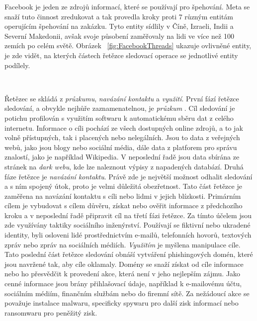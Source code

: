 Facebook je jeden ze zdrojů informací, které se používají pro špehování.
Meta se snaží tuto činnost zredukovat a tak provedla kroky proti 7 různým entitám operujícím špehování na zakázku.
Tyto entity sídlily v Číně, Izraeli, Indii a Severní Makedonii, avšak svoje působení zaměřovaly na lidi ve více než 100 zemích po celém světě.
Obrázek ~\ref{fig:FacebookThreads} ukazuje ovlivněné entity, je zde vidět, na kterých částech řetězce sledovací operace se jednotlivé entity podílely.

~

Řetězec se skládá z \textit{průzkumu}, \textit{navázání kontaktu} a \textit{využití}.
První fází řetězce sledování, a obvykle nejhůře zaznamenatelnou, je \textit{průzkum} .
Cíl sledování je potichu profilován s využitím softwaru k automatickému sběru dat z celého internetu.
Informace o cíli pochází ze všech dostupných online zdrojů, a to jak volně přístupných, tak i placených nebo nelegálních.
Jsou to data z veřejných webů, jako jsou blogy nebo sociální média, dále data z platforem pro správu znalostí, jako je například Wikipedia.
V neposlední řadě jsou data sbírána ze stránek na \textit{dark webu}, kde lze naleznout výpisy z napadených databází.
Druhá fáze řetězce je \textit{navázání kontaktu}.
Právě zde je největší možnost odhalit sledování a s ním spojený útok, proto je velmi důležitá obezřetnost.
Tato část řetězce je zaměřena na navázání kontaktu s cíli nebo lidmi v jejich blízkosti.
Primárním cílem je vybudovat s cílem důvěru, získat nebo ověřit informace z předchozího kroku a v neposlední řadě připravit cíl na třetí fázi řetězce.
Za tímto účelem jsou zde využívány taktiky sociálního inženýrství.
Používají se fiktivní nebo ukradené identity, byli osloveni lidé prostřednictvím e-mailů, telefonních hovorů, textových zpráv nebo zpráv na sociálních médiích.
\textit{Využitím} je myšlena manipulace cíle.
Tato poslední část řetězce sledování obnáší vytváření phishingových domén, které jsou navržené tak, aby cíle oklamaly.
Domény se snaží získat od cíle informace nebo ho přesvědčit k provedení akce, která není v jeho nejlepším zájmu.
Jako cenné informace jsou brány přihlašovací údaje, například k e-mailovému účtu, sociálním médiím, finančním službám nebo do firemní sítě.
Za nežádoucí akce se považuje instalace malwaru, specificky spywaru pro další zisk informací nebo ransomwaru pro peněžitý zisk.\cite{pegasus_facebook}

